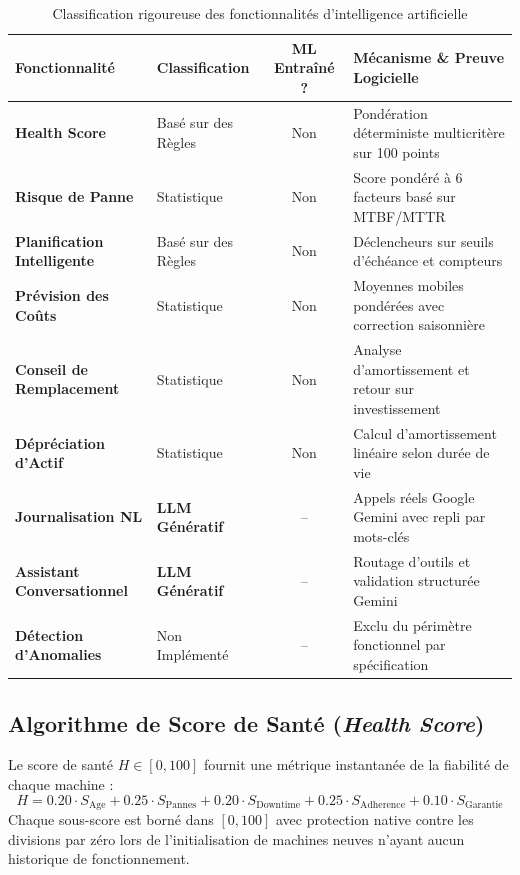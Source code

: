 \begin{table}[!ht]
\centering
\small
\renewcommand{\arraystretch}{1.2}
\begin{tabularx}{\textwidth}{l p{3.2cm} c p{6.0cm}}
\toprule
\textbf{Fonctionnalité} & \textbf{Classification} & \textbf{ML Entraîné ?} & \textbf{Mécanisme \& Preuve Logicielle} \\
\midrule
\textbf{Health Score} & Basé sur des Règles & Non & Pondération déterministe multicritère sur 100 points \\
\textbf{Risque de Panne} & Statistique & Non & Score pondéré à 6 facteurs basé sur MTBF/MTTR \\
\textbf{Planification Intelligente} & Basé sur des Règles & Non & Déclencheurs sur seuils d'échéance et compteurs \\
\textbf{Prévision des Coûts} & Statistique & Non & Moyennes mobiles pondérées avec correction saisonnière \\
\textbf{Conseil de Remplacement} & Statistique & Non & Analyse d'amortissement et retour sur investissement \\
\textbf{Dépréciation d'Actif} & Statistique & Non & Calcul d'amortissement linéaire selon durée de vie \\
\textbf{Journalisation NL} & \textbf{LLM Génératif} & -- & Appels réels Google Gemini avec repli par mots-clés \\
\textbf{Assistant Conversationnel} & \textbf{LLM Génératif} & -- & Routage d'outils et validation structurée Gemini \\
\textbf{Détection d'Anomalies} & Non Implémenté & -- & Exclu du périmètre fonctionnel par spécification \\
\bottomrule
\end{tabularx}
\caption{Classification rigoureuse des fonctionnalités d'intelligence artificielle}
\label{tab:ai_reality}
\end{table}

\subsection{Algorithme de Score de Santé (\textit{Health Score})}
Le score de santé $H \in [0, 100]$ fournit une métrique instantanée de la fiabilité de chaque machine :
\begin{equation}
H = 0.20 \cdot S_{\text{Age}} + 0.25 \cdot S_{\text{Pannes}} + 0.20 \cdot S_{\text{Downtime}} + 0.25 \cdot S_{\text{Adherence}} + 0.10 \cdot S_{\text{Garantie}}
\end{equation}
Chaque sous-score est borné dans $[0, 100]$ avec protection native contre les divisions par zéro lors de l'initialisation de machines neuves n'ayant aucun historique de fonctionnement.

